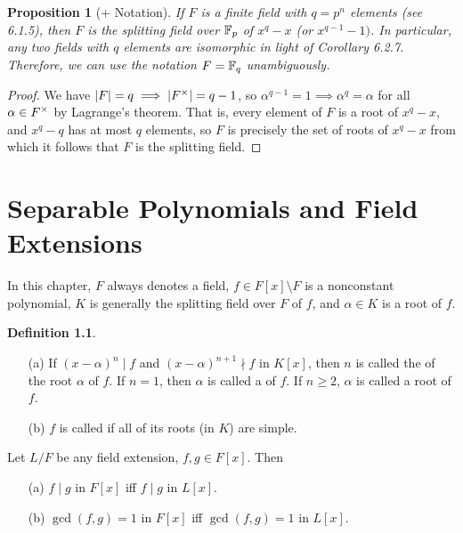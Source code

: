 \documentclass[11pt]{book}
\newcounter{counter}
\newtheorem{proposition}[counter]{Proposition}   \newtheorem{problem}[counter]{Problem}   \newtheorem*{proposition*}{Proposition}   \newtheorem*{lemma*}{Lemma}
\theoremstyle{definition}   \newtheorem{defn}[counter]{Definition} %
\newcommand{\bs}{\setminus}   \newcommand{\A}{\mathcal{A}}   \newcommand{\sy}{\textnormal{Syl}}   \newcommand{\size}[1]{\left| #1 \right|}
\newcommand{\vs}{\vspace{8pt}}
\numberwithin{counter}{chapter}
\begin{document}
\vs

\begin{proposition}[+ Notation]
If $F$ is a finite field with $q = p^n$ elements (see 6.1.5), then $F$ is the splitting field over $\mathbb{F}_p$ of $x^q-x$ (or $x^{q-1}-1)$. In particular, any two fields with $q$ elements are isomorphic in light of Corollary 6.2.7. Therefore, we can use the notation $F = \mathbb{F}_q$ unambiguously. 
\end{proposition}

\begin{proof}
We have $|F| = q \implies |F^{\times}| = q-1$, so $\alpha^{q-1} = 1 \implies \alpha^q = \alpha$ for all $\alpha \in F^{\times}$ by Lagrange's theorem. That is, every element of $F$ is a root of $x^q-x$, and $x^q-q$ has at most $q$ elements, so $F$ is precisely the set of roots of $x^q-x$ from which it follows that $F$ is the splitting field. 
\end{proof}




\chapter{Separable Polynomials and Field Extensions}



In this chapter, $F$ always denotes a field, $f \in F[x] \bs F$ is a nonconstant polynomial, $K$ is generally the splitting field over $F$ of $f$, and $\alpha \in K$ is a root of $f$. 
 
 
 \vs
 
 \begin{defn}\ 
 \begin{enumerate}
 \item[(a)] If $(x-\alpha)^n \mid f$ and $(x-\alpha)^{n+1} \nmid f$ in $K[x]$, then $n$ is called the  of the root $\alpha$ of $f$. If $n = 1$, then $\alpha$ is called a  of $f$. If $n \geq 2$, $\alpha$ is called a  root of $f$.
 \item[(b)] $f$ is called \tb{separable} if all of its roots (in $K$) are simple.  
 \end{enumerate}
 \end{defn}
 
 \vs
 
 \begin{lemma}
 Let $L/F$ be any field extension, $f,g \in F[x]$. Then
 \begin{enumerate}
 \item[(a)] $f \mid g$ in $F[x]$ iff $f \mid g$ in $L[x]$. 
 \item[(b)] $\gcd(f,g) = 1$ in $F[x]$ iff $\gcd(f,g) = 1$ in $L[x]$. 
 \end{enumerate}
 \end{lemma}
 
\end{document}
